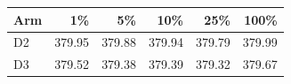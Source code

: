 \begin{tabular}{lrrrrr}
\toprule
Arm & 1\% & 5\% & 10\% & 25\% & 100\% \\
\midrule
D2 & 379.95 & 379.88 & 379.94 & 379.79 & 379.99 \\
D3 & 379.52 & 379.38 & 379.39 & 379.32 & 379.67 \\
\bottomrule
\end{tabular}
